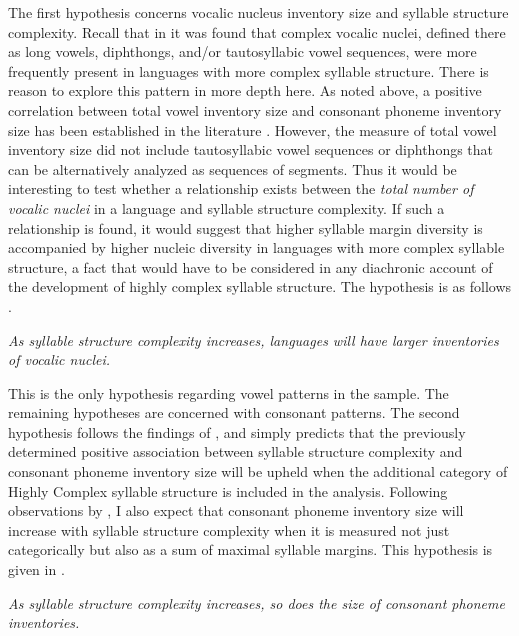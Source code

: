   The first hypothesis concerns vocalic nucleus inventory size and syllable structure complexity. Recall that in  it was found that complex vocalic nuclei, defined there as long vowels, diphthongs, and/or tautosyllabic vowel sequences, were more frequently present in languages with more complex syllable structure. There is reason to explore this pattern in more depth here. As noted above, a positive correlation between total vowel inventory size and consonant phoneme inventory size has been established in the literature \citep{Maddieson2011}. However, the measure of total vowel inventory size did not include tautosyllabic vowel sequences or diphthongs that can be alternatively analyzed as sequences of segments. Thus it would be interesting to test whether a relationship exists between the \textit{total number of vocalic nuclei} in a language and syllable structure complexity. If such a relationship is found, it would suggest that higher syllable margin diversity is accompanied by higher nucleic diversity in languages with more complex syllable structure, a fact that would have to be considered in any diachronic account of the development of highly complex syllable structure. The hypothesis is as follows .

\ea\label{ex:4.2}
  \textit{As syllable structure complexity increases, languages will have larger inventories of vocalic nuclei.}
\z

  This is the only hypothesis regarding vowel patterns in the sample. The remaining hypotheses are concerned with consonant patterns. The second hypothesis follows the findings of \citet{Maddieson2006}, and simply predicts that the previously determined positive association between syllable structure complexity and consonant phoneme inventory size will be upheld when the additional category of Highly Complex syllable structure is included in the analysis. Following observations by \citet{Gordon2016}, I also expect that consonant phoneme inventory size will increase with syllable structure complexity when it is measured not just categorically but also as a sum of maximal syllable margins. This hypothesis is given in .

\ea\label{ex:4.3}
  \textit{As syllable structure complexity increases, so does the size of consonant phoneme inventories.}
\z

